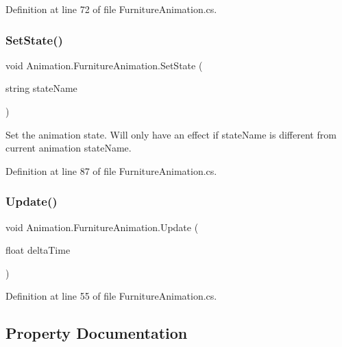 Definition at line 72 of file Furniture\+Animation.\+cs.

\mbox{\label{class_animation_1_1_furniture_animation_aae47f2b0d9440472a8e7b4f1bba52e45}} 
\subsubsection{\texorpdfstring{Set\+State()}{SetState()}}
{\footnotesize\ttfamily void Animation.\+Furniture\+Animation.\+Set\+State (\begin{DoxyParamCaption}\item[{string}]{state\+Name }\end{DoxyParamCaption})}



Set the animation state. Will only have an effect if state\+Name is different from current animation state\+Name. 



Definition at line 87 of file Furniture\+Animation.\+cs.

\mbox{\label{class_animation_1_1_furniture_animation_a3ecc2e6776aaf24f511fb7661638c6b7}} 
\subsubsection{\texorpdfstring{Update()}{Update()}}
{\footnotesize\ttfamily void Animation.\+Furniture\+Animation.\+Update (\begin{DoxyParamCaption}\item[{float}]{delta\+Time }\end{DoxyParamCaption})}



Definition at line 55 of file Furniture\+Animation.\+cs.



\subsection{Property Documentation}
\mbox{\label{class_animation_1_1_furniture_animation_a0fd63221e8b26694638564218cdb6ec3}} 
